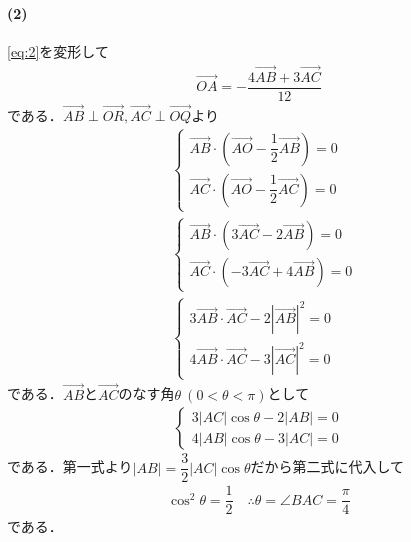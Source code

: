 \documentclass[../../main.tex]{subfiles}
\begin{document}
\paragraph{(2)}

\cref{eq:2}を変形して
\begin{align}
  \overrightarrow{OA} = -\dfrac{4\overrightarrow{AB} + 3\overrightarrow{AC}}{12} \label{eq:3}
\end{align}
である．$\overrightarrow{AB}\perp\overrightarrow{OR}, \overrightarrow{AC}\perp\overrightarrow{OQ}$より
\begin{align}
  &
  \begin{cases}
    \overrightarrow{AB} \cdot \left(\overrightarrow{AO} - \dfrac{1}{2}\overrightarrow{AB}\right) = 0 \\
    \overrightarrow{AC} \cdot \left(\overrightarrow{AO} - \dfrac{1}{2}\overrightarrow{AC}\right) = 0
  \end{cases} \\
  &
  \begin{cases}
    \overrightarrow{AB} \cdot \left(3\overrightarrow{AC} - 2\overrightarrow{AB}\right) = 0 \\
    \overrightarrow{AC} \cdot \left(-3\overrightarrow{AC} +4\overrightarrow{AB}\right) = 0
  \end{cases} \\
  &
  \begin{cases}
    3\overrightarrow{AB}\cdot\overrightarrow{AC} - 2|\overrightarrow{AB}|^2 = 0 \\
    4\overrightarrow{AB}\cdot\overrightarrow{AC} - 3|\overrightarrow{AC}|^2 = 0
  \end{cases}
\end{align}
である．$\overrightarrow{AB}$と$\overrightarrow{AC}$のなす角$\theta\ (0 < \theta < \pi)$として
\begin{align}
  \begin{cases}
    3|AC|\cos\theta - 2|AB|= 0 \\
    4|AB|\cos\theta - 3|AC|=0
  \end{cases}
\end{align}
である．第一式より$|AB|=\dfrac{3}{2}|AC|\cos\theta$だから第二式に代入して
\begin{align}
  \cos^2\theta = \dfrac{1}{2}
  \quad\therefore
  \theta = \angle BAC = \dfrac{\pi}{4}
\end{align}
である．

\end{document}

